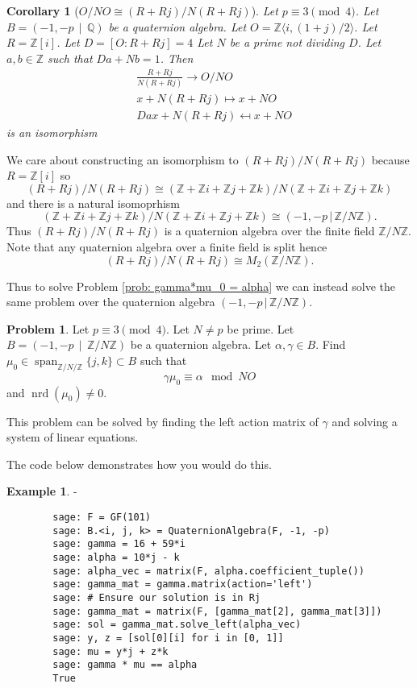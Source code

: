 \documentclass[10pt]{article}
\theoremstyle{plain}
\newtheorem{corollary}[theorem]{Corollary}
\theoremstyle{definition}
\newtheorem{example}[theorem]{Example}
\newtheorem{prob}[theorem]{Problem}
\newcommand{\iso}{\cong}
\newcommand{\op}{\operatorname}
\newcommand{\Z}{\mathbb{Z}}
\newcommand{\Q}{\mathbb{Q}}
\newcommand{\nrd}{\op{nrd}}
\begin{document}
\begin{corollary}[\( O / NO \iso (R + Rj) / N(R + Rj)\)]
    Let \( p \equiv 3 \pmod{4} \).
    Let \( B =  (-1, -p \, \mid \, \Q) \) be a quaternion algebra.
    Let \( O = \Z \langle i, (1+j) / 2 \rangle \).
    Let \( R = \Z[i] \).
    Let \( D =  [O : R + Rj] = 4\)
    Let \( N \) be a prime not dividing \( D \).
    Let \( a, b \in \Z \) such that \( Da + Nb = 1 \).
    Then
    \begin{align*}
          & \frac{R + Rj}{N(R + Rj)} \to O / NO \\
          & x + N(R + Rj)\mapsto x + NO         \\
          & Dax + N(R + Rj) \mapsfrom x + NO
    \end{align*}
    is an isomorphism
\end{corollary}

We care about constructing an isomorphism to \( (R + Rj) / N(R + Rj) \) because \( R = \Z[i] \) so
\[
    (R + Rj) / N(R + Rj) \iso (\Z + \Z i + \Z j + \Z k) / N (\Z + \Z i + \Z j + \Z k)
\]
and there is a natural isomoprhism
\[
    (\Z + \Z i + \Z j + \Z k) / N (\Z + \Z i + \Z j + \Z k) \iso (-1, -p \, |\, \Z / N \Z).
\]
Thus \( (R + Rj) / N(R + Rj) \) is a quaternion algebra over the finite field \( \Z / N\Z \).
Note that any quaternion algebra over a finite field is split hence
\[
    (R + Rj) / N(R + Rj) \iso M_2(\Z / N \Z  ).
\]

Thus to solve Problem \ref{prob: gamma*mu_0 = alpha} we can instead solve the same problem over the quaternion algebra \( ( -1, -p \, |\, \Z / N \Z) \).

\begin{prob}
    Let \( p \equiv 3 \pmod{4} \).
    Let \( N \neq p\) be prime.
    Let \( B =  (-1, -p \, \mid \, \Z / N \Z) \) be a quaternion algebra.
    Let \( \alpha, \gamma \in B \).
    Find \( \mu_0 \in \op{span}_{\Z / N / \Z}\{j, k\} \subset  B \) such that
    \[
        \gamma\mu_0 \equiv \alpha \mod NO
    \]
    and \( \nrd(\mu_0) \neq 0 \).
\end{prob}

This problem can be solved by finding the left action matrix of \( \gamma \) and solving a system of linear equations.

The code below demonstrates how you would do this.

\begin{example}
    -
    \begin{lstlisting}
        sage: F = GF(101)
        sage: B.<i, j, k> = QuaternionAlgebra(F, -1, -p)
        sage: gamma = 16 + 59*i
        sage: alpha = 10*j - k
        sage: alpha_vec = matrix(F, alpha.coefficient_tuple())
        sage: gamma_mat = gamma.matrix(action='left')
        sage: # Ensure our solution is in Rj
        sage: gamma_mat = matrix(F, [gamma_mat[2], gamma_mat[3]])
        sage: sol = gamma_mat.solve_left(alpha_vec)
        sage: y, z = [sol[0][i] for i in [0, 1]]
        sage: mu = y*j + z*k
        sage: gamma * mu == alpha
        True
    \end{lstlisting}
\end{example}
\end{document}
